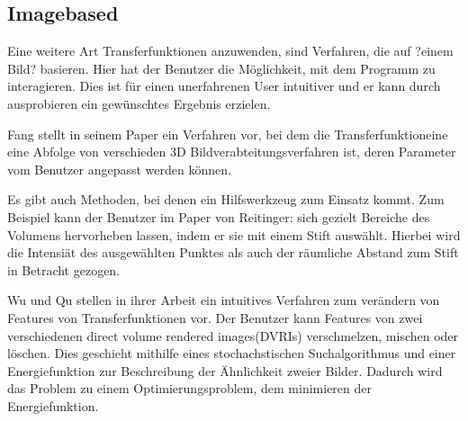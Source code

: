 \subsection{Imagebased}
Eine weitere Art Transferfunktionen anzuwenden, sind Verfahren, die auf ?einem Bild? basieren. Hier hat der Benutzer die Möglichkeit, mit dem Programm zu interagieren. Dies ist für einen unerfahrenen User intuitiver und er kann durch ausprobieren ein gewünschtes Ergebnis erzielen.

Fang stellt in seinem Paper \cite{fang1998image} ein Verfahren vor, bei dem die  Transferfunktioneine eine Abfolge von verschieden 3D Bildverabteitungsverfahren ist, deren Parameter vom Benutzer angepasst werden können.

Es gibt auch Methoden, bei denen ein Hilfswerkzeug zum Einsatz kommt. Zum Beispiel kann der Benutzer im Paper von Reitinger: \cite{reitinger2004user} sich gezielt Bereiche des Volumens hervorheben lassen, indem er sie mit einem Stift auswählt. Hierbei wird die Intensiät des ausgewählten Punktes als auch der räumliche Abstand zum Stift in Betracht gezogen.

Wu und Qu stellen in ihrer Arbeit \cite{wu2007interactive} ein intuitives Verfahren zum verändern von Features von Transferfunktionen vor.
Der Benutzer kann Features von zwei verschiedenen direct volume rendered images(DVRIs) verschmelzen, mischen oder löschen. Dies geschieht mithilfe eines stochachstischen Suchalgorithmus und einer Energiefunktion zur Beschreibung der Ähnlichkeit zweier Bilder. Dadurch wird das Problem zu einem Optimierungsproblem, dem minimieren der Energiefunktion.



























































